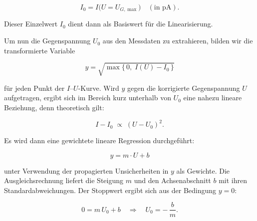 \begin{equation}
  I_{0} = I\bigl(U = U_{G,\max}\bigr)\quad(\text{in pA}).
\end{equation}

Dieser Einzelwert $I_{0}$ dient dann als Basiswert für die Linearisierung.

Um nun die Gegenspannung $U_{0}$ aus den Messdaten zu extrahieren, bilden wir die transformierte Variable

\begin{equation}
  y = \sqrt{\max\{\,0,\;I(U) - I_{0}\,\}}
\end{equation}

für jeden Punkt der $I$–$U$-Kurve. Wird $y$ gegen die korrigierte Gegenspannung $U$ aufgetragen, ergibt sich im Bereich kurz unterhalb von $U_{0}$ eine nahezu lineare Beziehung, denn theoretisch gilt:

\begin{equation}
  I - I_{0} \;\propto\;(U - U_{0})^{2}.
\end{equation}

Es wird dann eine gewichtete lineare Regression durchgeführt:

\begin{equation}
    y = m \cdot U + b
\end{equation}

unter Verwendung der propagierten Unsicherheiten in $y$ als Gewichte. Die Ausgleichsrechnung liefert die Steigung $m$ und den Achsenabschnitt $b$ mit ihren Standardabweichungen. Der Stoppwert ergibt sich aus der Bedingung $y=0$:

\begin{equation}
  0 = m\,U_{0} + b
  \quad\Longrightarrow\quad
  U_{0} = -\,\frac{b}{m}.
\end{equation}

